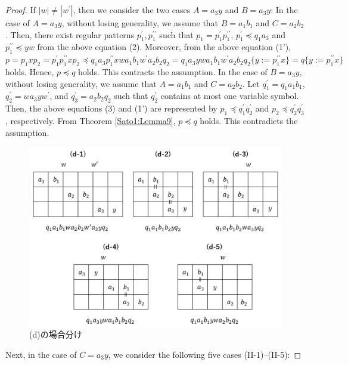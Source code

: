 \begin{proof}
\noindent
If $|w| \ne |w^{\prime}|$, then we consider the two cases $A=a_{3}y$ and $B=a_{3}y$:
In the case of $A=a_{3}y$, without losing generality, we assume that $B=a_{1}b_{1}$ and $C=a_{2}b_{2}$. 
Then, there exist regular patterns $p_{1}^{\prime}, p_{1}^{\prime\prime}$ such that $p_{1}=p_{1}^{\prime}p_{1}^{\prime\prime}$, $p_{1}^{\prime} \preceq q_{1}a_{3}$ and $p_{1}^{\prime\prime} \preceq yw$ from the above equation (2).
Moreover, from the above equation (1'), $p=p_{1}xp_{2}=p_{1}^{\prime}p_{1}^{\prime\prime}xp_{2}\preceq q_{1}a_{3}p_{1}^{\prime\prime}xwa_{1}b_{1}w^{\prime}a_{2}b_{2}q_{2}=
q_{1}a_{3}ywa_{1}b_{1}w^{\prime}a_{2}b_{2}q_{2}\{ y := p_{1}^{\prime\prime}x \}=q \{ y := p_{1}^{\prime\prime}x \}$ holds.
Hence, $p \preceq q$ holds.
This contracts the assumption.
In the case of $B=a_{3}y$, without losing generality, we assume that $A=a_{1}b_{1}$ and $C=a_{2}b_{2}$.
Let $q_{1}^{\prime}=q_{1}a_{1}b_{1}$, $q_{2}^{\prime}=wa_{3}yw^{\prime}$, and $q_{3}^{\prime}=a_{2}b_{2}q_{2}$ such that $q_{2}^{\prime}$ contains at most one variable symbol.
Then, the above equations (3) and (1') are represented by $p_{1} \preceq q_{1}^{\prime}q_{2}^{\prime}$ and $p_{2} \preceq q_{2}^{\prime}q_{3}^{\prime}$, respectively.
From Theorem \ref{Sato1:Lemma9}, $p \preceq q$ holds.
This contradicts the assumption.

\begin{figure}
  \centering
  \includegraphics[width=\linewidth]{figs/Cases-d.png}
  \vspace{-1cm}
  \caption{(d)の場合分け}
  \label{d組み合わせ}
\end{figure}
    
Next, in the case of $C=a_{3}y$, we consider the following five cases (II-1)--(II-5):


\end{proof}
